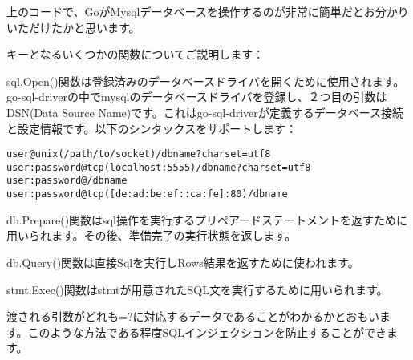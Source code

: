上のコードで、GoがMysqlデータベースを操作するのが非常に簡単だとお分かりいただけたかと思います。

キーとなるいくつかの関数についてご説明します：

sql.Open()関数は登録済みのデータベースドライバを開くために使用されます。go-sql-driverの中でmysqlのデータベースドライバを登録し、２つ目の引数はDSN(Data Source Name)です。これはgo-sql-driverが定義するデータベース接続と設定情報です。以下のシンタックスをサポートします：

\begin{lstlisting}[numbers=none]
user@unix(/path/to/socket)/dbname?charset=utf8
user:password@tcp(localhost:5555)/dbname?charset=utf8
user:password@/dbname
user:password@tcp([de:ad:be:ef::ca:fe]:80)/dbname
\end{lstlisting}

db.Prepare()関数はsql操作を実行するプリペアードステートメントを返すために用いられます。その後、準備完了の実行状態を返します。

db.Query()関数は直接Sqlを実行しRows結果を返すために使われます。

stmt.Exec()関数はstmtが用意されたSQL文を実行するために用いられます。

渡される引数がどれも=?に対応するデータであることがわかるかとおもいます。このような方法である程度SQLインジェクションを防止することができます。

